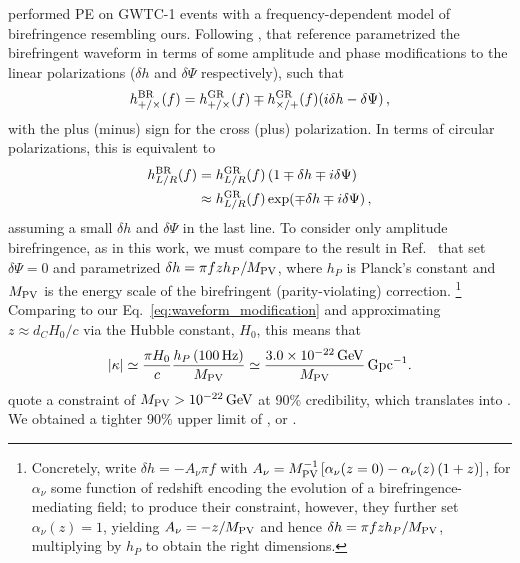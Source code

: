 \documentclass[aps,prd,twocolumn,superscriptaddress,preprintnumbers,nofootinbib]{revtex4-2}
\begin{document}
\citet{Wang_2021} performed \ac{PE} on GWTC-1 events with a frequency-dependent model of birefringence resembling ours.
Following \cite{Zhao:2019xmm}, that reference parametrized the birefringent waveform in terms of some amplitude and phase modifications to the linear polarizations ($\delta h$ and $\delta \Psi$ respectively), such that
\begin{equation}
    h_{+/\times}^{\rm BR}(f) = h_{+/\times}^{\rm GR}(f)\mp h_{\times/+}^{\rm GR}(f)(i\delta h-\delta\Psi)\,,
\end{equation}
with the plus (minus) sign for the cross (plus) polarization.
In terms of circular polarizations, this is equivalent to 
\begin{align}
h^{\rm BR}_{L/R}(f) &= h^{\rm GR}_{L/R}(f) \left(1 \mp \delta h \mp i \delta \Psi \right) \nonumber\\
&\approx h^{\rm GR}_{L/R}(f) \exp(\mp \delta h \mp i \delta \Psi) \, ,
\end{align}
assuming a small $\delta h$ and $\delta \Psi$ in the last line.
To consider only amplitude birefringence, as in this work, we must compare to the result in Ref.~\citep{Wang_2021} that set $\delta \Psi = 0$ and parametrized $\delta h = \pi f z h_P / M_{\rm PV}$, where $h_P$ is Planck's constant and $M_{\rm PV}$ is the energy scale of the birefringent (parity-violating) correction.%
\footnote{Concretely, \citet{Wang_2021} write $\delta h = - A_\nu \pi f$ with $A_\nu = M_{\rm PV}^{-1} \left[\alpha_\nu (z=0) - \alpha_\nu(z) \left(1+z\right)\right]$, for $\alpha_\nu$ some function of redshift encoding the evolution of a birefringence-mediating field; to produce their constraint, however, they further set $\alpha_\nu(z) = 1$, yielding $A_\nu = -z / M_{\rm PV}$ and hence $\delta h = \pi f z h_P / M_{\rm PV}$, multiplying by $h_P$ to obtain the right dimensions.}
Comparing to our Eq.~\eqref{eq:waveform_modification} and approximating $z \approx d_C H_0/c$ via the Hubble constant, $H_0$, this means that
\begin{equation}
    \label{eq:kappa-to-Mpv}
    |\kappa| \simeq \frac{\pi H_0}{c} \frac{h_P \left( 100 \, \mathrm{Hz} \right)}{M_{\rm PV}} \simeq \frac{3.0 \times 10^{-22} \, \mathrm{GeV}}{M_\mathrm{PV}} \, \mathrm{Gpc}^{-1} .
\end{equation}
\citet{Wang_2021} quote a constraint of $M_{\rm PV} > 10^{-22}\, {\rm GeV}$ at 90\% credibility, which translates into .
We obtained a tighter 90\% upper limit of , or .
\end{document}
